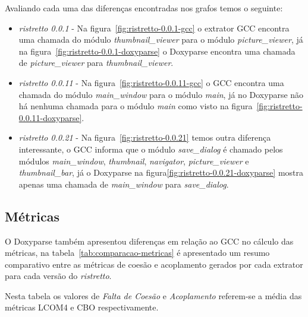 Avaliando cada uma das diferenças encontradas nos grafos temos o seguinte:

\begin{itemize}

\item {\it ristretto 0.0.1} - Na figura~\ref{fig:ristretto-0.0.1-gcc} o
extrator GCC encontra uma chamada do módulo {\it thumbnail\_viewer} para o módulo {\it
picture\_viewer}, já na figura~\ref{fig:ristretto-0.0.1-doxyparse} o Doxyparse
encontra uma chamada de {\it picture\_viewer} para {\it thumbnail\_viewer}.

\item {\it ristretto 0.0.11} - Na figura~\ref{fig:ristretto-0.0.11-gcc} o GCC
encontra uma chamada do módulo {\it main\_window} para o módulo {\it main}, já
no Doxyparse não há nenhuma chamada para o módulo {\it main} como visto na
figura~\ref{fig:ristretto-0.0.11-doxyparse}. 

\item {\it ristretto 0.0.21} - Na figura~\ref{fig:ristretto-0.0.21} temos outra
diferença interessante, o GCC informa que o módulo {\it save\_dialog} é chamado
pelos módulos {\it main\_window}, {\it thumbnail}, {\it navigator}, {\it
picture\_viewer} e {\it thumbnail\_bar}, já o Doxyparse na
figura\ref{fig:ristretto-0.0.21-doxyparse} mostra apenas uma chamada de {\it
main\_window} para {\it save\_dialog}.

\end{itemize}

\subsection{Métricas}

O Doxyparse também apresentou diferenças em relação ao GCC no cálculo das
métricas, na tabela~\ref{tab:comparacao-metricas} é apresentado um resumo
comparativo entre as métricas de coesão e acoplamento gerados por cada extrator
para cada versão do {\it ristretto}.

Nesta tabela os valores de {\it Falta de Coesão} e {\it Acoplamento} referem-se
a média das métricas LCOM4 e CBO respectivamente.

